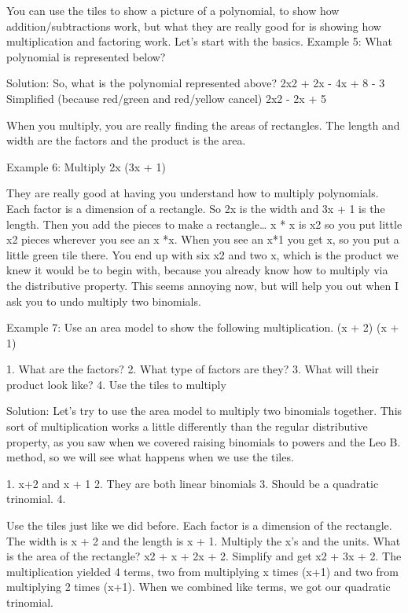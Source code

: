  

You can use the tiles to show a picture of a polynomial, to show how addition/subtractions work, but what they are really good for is showing how multiplication and factoring work. Let's start with the basics.
Example 5: What polynomial is represented below?

Solution: So, what is the polynomial represented above?
2x2 + 2x - 4x + 8 - 3
Simplified (because red/green and red/yellow cancel) 
2x2 - 2x + 5

When you multiply, you are really finding the areas of rectangles. The length and width are the factors and the product is the area. 

Example 6: Multiply 2x (3x + 1)

They are really good at having you understand how to multiply polynomials. Each factor is a dimension of a rectangle. So 2x is the width and 3x + 1 is the length. Then you add the pieces to make a rectangle\ldots{} x * x is x2 so you put little x2 pieces wherever you see an x *x. When you see an x*1 you get x, so you put a little green tile there. You end up with six x2 and two x, which is the product we knew it would be to begin with, because you already know how to multiply via the distributive property. This seems annoying now, but will help you out when I ask you to undo multiply two binomials.

Example 7: Use an area model to show the following multiplication. (x + 2) (x + 1) 

1. What are the factors? 
2. What type of factors are they?
3. What will their product look like?
4. Use the tiles to multiply

Solution: Let's try to use the area model to multiply two binomials together. This sort of multiplication works a little differently than the regular distributive property, as you saw when we covered raising binomials to powers and the Leo B. method, so we will see what happens when we use the tiles.

1. x+2 and x + 1
2. They are both linear binomials
3. Should be a quadratic trinomial.
4. 

Use the tiles just like we did before. Each factor is a dimension of the rectangle. The width is x + 2 and the length is x + 1. Multiply the x's and the units. What is the area of the rectangle? x2 + x + 2x + 2. Simplify and get x2 + 3x + 2. The multiplication yielded 4 terms, two from multiplying x times (x+1) and two from multiplying 2 times (x+1). When we combined like terms, we got our quadratic trinomial.

